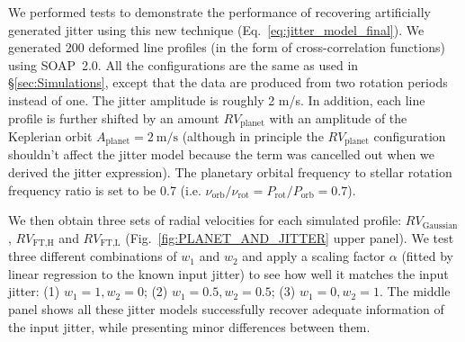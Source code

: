 We performed tests to demonstrate the performance of recovering artificially generated jitter using this new technique (Eq.~\ref{eq:jitter_model_final}). We generated 200 deformed line profiles (in the form of cross-correlation functions) using SOAP~2.0. All the configurations are the same as used in \S\ref{sec:Simulations}, except that the data are produced from two rotation periods instead of one. The jitter amplitude is roughly 2 m/s. In addition, each line profile is further shifted by an amount $RV_\text{planet}$ with an amplitude of the Keplerian orbit $A_\text{planet} = 2~\text{m/s}$ (although in principle the $RV_\text{planet}$ configuration shouldn't affect the jitter model because the term was cancelled out when we derived the jitter expression). The planetary orbital frequency to stellar rotation frequency ratio is set to be 0.7 (i.e. $\nu_\text{orb}/\nu_\text{rot} = P_\text{rot}/P_\text{orb} = 0.7$). 

We then obtain three sets of radial velocities for each simulated profile: $RV_\text{Gaussian}$, $RV_\text{FT,H}$ and $RV_\text{FT,L}$ (Fig.~\ref{fig:PLANET_AND_JITTER} upper panel). We test three different combinations of $w_1$ and $w_2$ and apply a scaling factor $\alpha$ (fitted by linear regression to the known input jitter) to see how well it matches the input jitter: (1) $w_1=1, w_2=0$; (2) $w_1=0.5, w_2=0.5$; (3) $w_1=0, w_2=1$. The middle panel shows all these jitter models successfully recover adequate information of the input jitter, while presenting minor differences between them. 

